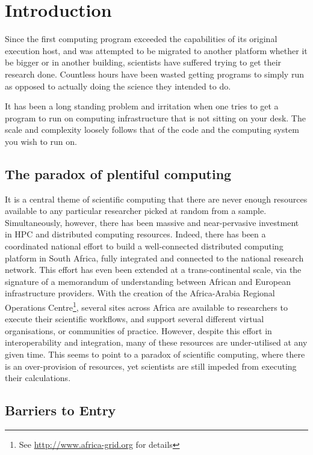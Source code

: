 \documentclass[a4paper]{jpconf}
\begin{document}
\section{Introduction}
Since the first computing program exceeded the capabilities of its original execution host, and was attempted to be migrated to another platform whether it be bigger or
in another building, scientists have suffered trying to get their research done.
Countless hours have been wasted getting programs to simply run as opposed to actually
doing the science they intended to do.

It has been a long standing problem and irritation when one tries to get a program to run on computing infrastructure that is not sitting on your desk. The scale and complexity loosely follows that of the code and the computing system you wish to run on.

\subsection{The paradox of  plentiful computing}

It is a central theme of scientific computing that there are never enough resources available to any particular researcher picked at random from a sample. Simultaneously, however, there has been massive and near-pervasive investment in HPC and distributed computing resources. Indeed, there has been a coordinated national effort to build a well-connected distributed computing platform in South Africa\cite{SAGrid}, fully integrated and connected to the national research network\cite{SANREN}. This effort has even been extended at a trans-continental scale, via the signature of a memorandum of understanding between African and European infrastructure providers\cite{AAROC}. With the creation of the Africa-Arabia Regional Operations Centre\footnote{See \url{http://www.africa-grid.org} for details}, several sites across Africa are available to researchers to execute their scientific workflows, and support several different virtual organisations, or communities of practice. However, despite this effort in interoperability and integration, many of these resources are under-utilised at any given time. This seems to point to a paradox of scientific computing, where there is an over-provision of resources, yet scientists are still impeded from executing their calculations.

\subsection{Barriers to Entry}
\end{document}

